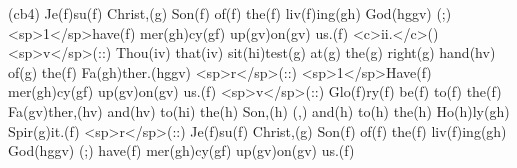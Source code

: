 (cb4) Je(f)su(f) Christ,(g) Son(f) of(f) the(f) liv(f)ing(gh) God(hggv) (;) <sp>1</sp>have(f) mer(gh)cy(gf) up(gv)on(gv) us.(f) <c>ii.</c>() <sp>v</sp>(::) Thou(iv) that(iv) sit(hi)test(g) at(g) the(g) right(g) hand(hv) of(g) the(f) Fa(gh)ther.(hggv) <sp>r</sp>(::) <sp>1</sp>Have(f) mer(gh)cy(gf) up(gv)on(gv) us.(f) <sp>v</sp>(::) Glo(f)ry(f) be(f) to(f) the(f) Fa(gv)ther,(hv) and(hv) to(hi) the(h) Son,(h) (,) and(h) to(h) the(h) Ho(h)ly(gh) Spir(g)it.(f) <sp>r</sp>(::) Je(f)su(f) Christ,(g) Son(f) of(f) the(f) liv(f)ing(gh) God(hggv) (;) have(f) mer(gh)cy(gf) up(gv)on(gv) us.(f)